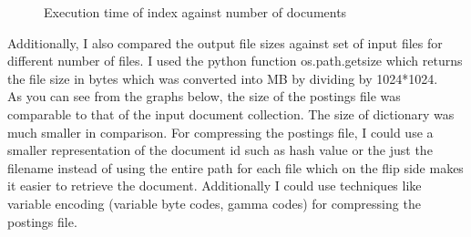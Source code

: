 \documentclass[paper=a4, fontsize=11pt]{scrartcl}
\numberwithin{equation}{section}		%
\numberwithin{figure}{section}			%
\numberwithin{table}{section}				%
\begin{document}
\begin{figure}[h]
\centering
{}
\caption{Execution time of index against number of documents}
\end{figure}

Additionally, I also compared the output file sizes against set of input files for different number of files. I used the python function os.path.getsize which returns the file size in bytes which was converted into MB by dividing by 1024*1024. \\

As you can see from the graphs below, the size of the postings file was comparable to that of the input document collection. The size of dictionary was much smaller in comparison. For compressing the postings file, I could use a smaller representation of the document id such as hash value or the just the filename instead of using the entire path for each file which on the flip side makes it easier to retrieve the document. Additionally I could use techniques like variable encoding (variable byte codes, gamma codes)  \cite{comp} for compressing the postings file.   
\end{document}
